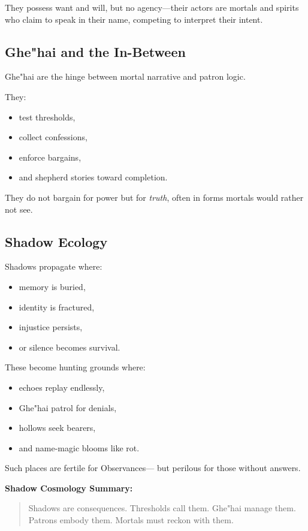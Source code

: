 \documentclass[11pt]{book}
\begin{document}
They possess want and will,  
but no agency---their actors are mortals and spirits  
who claim to speak in their name,  
competing to interpret their intent.

\subsection{Ghe"hai and the In-Between}

Ghe"hai are the hinge between mortal narrative and patron logic.

They:
\begin{itemize}
    \item test thresholds,
    \item collect confessions,
    \item enforce bargains,
    \item and shepherd stories toward completion.
\end{itemize}

They do not bargain for power but for \emph{truth},  
often in forms mortals would rather not see.

\subsection{Shadow Ecology}

Shadows propagate where:
\begin{itemize}
    \item memory is buried,
    \item identity is fractured,
    \item injustice persists,
    \item or silence becomes survival.
\end{itemize}

These become hunting grounds where:
\begin{itemize}
    \item echoes replay endlessly,
    \item Ghe"hai patrol for denials,
    \item hollows seek bearers,
    \item and name-magic blooms like rot.
\end{itemize}

Such places are fertile for Observances---  
but perilous for those without answers.

\bigskip

\noindent
\textbf{Shadow Cosmology Summary:}
\begin{quote}
Shadows are consequences.  
Thresholds call them.  
Ghe"hai manage them.  
Patrons embody them.  
Mortals must reckon with them.
\end{quote}
\end{document}
